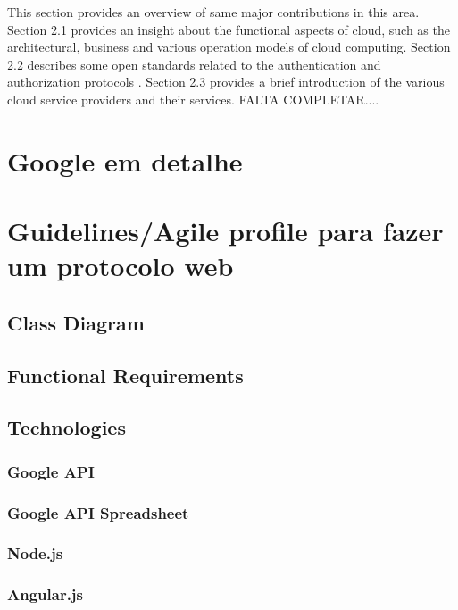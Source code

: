 


This section provides an overview of same major contributions in this area. Section 2.1 provides an insight about the functional aspects of cloud, such as the architectural, business and various operation models of cloud computing. Section 2.2 describes some open standards related to the authentication and authorization protocols . Section 2.3 provides a brief introduction of the various cloud service providers and their services. FALTA COMPLETAR.... 
\section{Google em detalhe}
\section{Guidelines/Agile profile para fazer um protocolo web}\label{ssec:tools}




\subsection{Class Diagram}
\subsection{Functional Requirements}
\subsection{Technologies}
\subsubsection{Google API}
\subsubsection{Google API Spreadsheet}
\subsubsection{Node.js}
\subsubsection{Angular.js}

